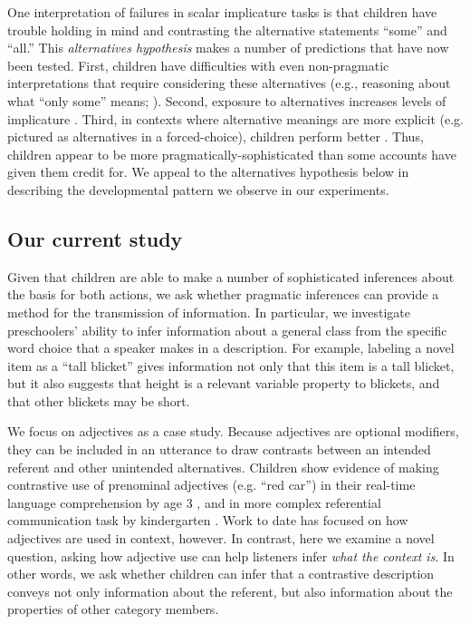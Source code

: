 \documentclass[man]{apa2}
\begin{document}
One interpretation of failures in scalar implicature tasks is that children have trouble holding in mind and contrasting the alternative statements ``some'' and ``all.'' This \emph{alternatives hypothesis} makes a number of predictions that have now been tested. First, children have difficulties with even non-pragmatic interpretations that require considering these alternatives (e.g., reasoning about what ``only some'' means; ). Second, exposure to alternatives increases levels of implicature \cite{skordos2014}. Third, in contexts where alternative meanings are more explicit (e.g. pictured as alternatives in a forced-choice), children perform better \cite{miller2005,stiller2014}. Thus, children appear to be more pragmatically-sophisticated than some accounts have given them credit for. We appeal to the alternatives hypothesis below in describing the developmental pattern we observe in our experiments. 

\subsection{Our current study}

Given that children are able to make a number of sophisticated inferences about the basis for both actions, we ask whether pragmatic inferences can provide a method for the transmission of information. In particular, we investigate preschoolers' ability to infer information about a general class from the specific word choice that a speaker makes in a description. For example, labeling a novel item as a ``tall blicket'' gives information not only that this item is a tall blicket, but it also suggests that height is a relevant variable property to blickets, and that other blickets may be short. 

We focus on adjectives as a case study.  Because adjectives are optional modifiers, they can be included in an utterance to draw contrasts between an intended referent and other unintended alternatives. 
Children show evidence of making contrastive use of prenominal adjectives (e.g. ``red car'') in their real-time language comprehension by age 3 \cite{fernald2010}, and in more complex referential communication task by kindergarten \cite{nadig2002}. Work to date has focused on how adjectives are used in context, however.  In contrast, here we examine a novel question, asking how adjective use can help listeners infer \emph{what the context is}.  In other words, we ask whether children can infer that a contrastive description conveys not only information about the referent, but also information about the properties of other category members.
\end{document}
